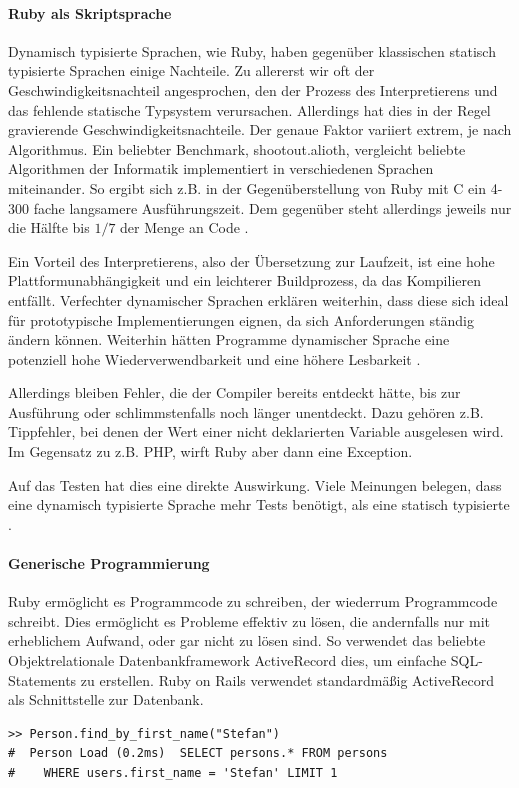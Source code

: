 \paragraph{Ruby als Skriptsprache}
Dynamisch typisierte Sprachen, wie Ruby, haben gegenüber klassischen statisch typisierte Sprachen einige Nachteile. Zu allererst wir oft der Geschwindigkeitsnachteil angesprochen, den der Prozess des Interpretierens und das fehlende statische Typsystem verursachen.
Allerdings hat dies in der Regel gravierende Geschwindigkeitsnachteile. Der genaue Faktor variiert extrem, je nach Algorithmus. Ein beliebter Benchmark, shootout.alioth, vergleicht beliebte Algorithmen der Informatik implementiert in verschiedenen Sprachen miteinander. So ergibt sich z.B. in der Gegenüberstellung von Ruby mit C ein 4-300 fache langsamere Ausführungszeit. Dem gegenüber steht allerdings jeweils nur die Hälfte bis $1/7$ der Menge an Code \citep{computer_language_benchmarks_game_ruby_2011}.

Ein Vorteil des Interpretierens, also der Übersetzung zur Laufzeit, ist eine hohe Plattformunabhängigkeit und ein leichterer Buildprozess, da das Kompilieren entfällt. 
Verfechter dynamischer Sprachen erklären weiterhin, dass diese sich ideal für prototypische Implementierungen eignen, da sich Anforderungen ständig ändern können. Weiterhin hätten Programme dynamischer Sprache eine potenziell hohe Wiederverwendbarkeit und eine höhere Lesbarkeit \citep{meijer_static_2005} \citep{ousterhout_scripting:_1998}.

Allerdings bleiben Fehler, die der Compiler bereits entdeckt hätte, bis zur Ausführung oder schlimmstenfalls noch länger unentdeckt. Dazu gehören z.B. Tippfehler, bei denen der Wert einer nicht deklarierten Variable ausgelesen wird. Im Gegensatz zu z.B. PHP, wirft Ruby aber dann eine Exception.

Auf das Testen hat dies eine direkte Auswirkung. Viele Meinungen belegen, dass eine dynamisch typisierte Sprache mehr Tests benötigt, als eine statisch typisierte \citep{daniel_spiewak_dynamic_2010}. 



\paragraph{Generische Programmierung}
Ruby ermöglicht es Programmcode zu schreiben, der wiederrum Programmcode schreibt. Dies ermöglicht es Probleme effektiv zu lösen, die andernfalls nur mit erheblichem Aufwand, oder gar nicht zu lösen sind. So verwendet das beliebte Objektrelationale Datenbankframework ActiveRecord dies, um einfache SQL-Statements zu erstellen. Ruby on Rails verwendet standardmäßig ActiveRecord als Schnittstelle zur Datenbank.
\begin{lstlisting}
>> Person.find_by_first_name("Stefan")
#  Person Load (0.2ms)  SELECT persons.* FROM persons
#    WHERE users.first_name = 'Stefan' LIMIT 1
\end{lstlisting}

